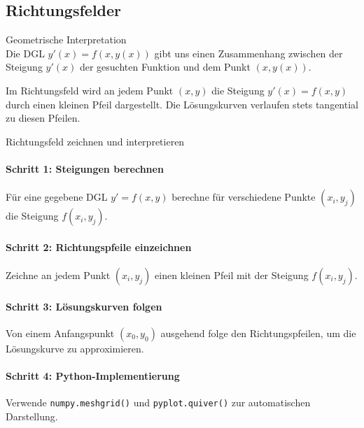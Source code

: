 \raggedcolumns
\columnbreak

\subsection{Richtungsfelder}

\begin{concept}{Geometrische Interpretation}\\
Die DGL $y'(x) = f(x, y(x))$ gibt uns einen Zusammenhang zwischen der Steigung $y'(x)$ der gesuchten Funktion und dem Punkt $(x, y(x))$.

Im Richtungsfeld wird an jedem Punkt $(x,y)$ die Steigung $y'(x) = f(x,y)$ durch einen kleinen Pfeil dargestellt. Die Lösungskurven verlaufen stets tangential zu diesen Pfeilen.
\end{concept}

\begin{KR}{Richtungsfeld zeichnen und interpretieren}
\paragraph{Schritt 1: Steigungen berechnen}
Für eine gegebene DGL $y' = f(x,y)$ berechne für verschiedene Punkte $(x_i, y_j)$ die Steigung $f(x_i, y_j)$.

\paragraph{Schritt 2: Richtungspfeile einzeichnen}
Zeichne an jedem Punkt $(x_i, y_j)$ einen kleinen Pfeil mit der Steigung $f(x_i, y_j)$.

\paragraph{Schritt 3: Lösungskurven folgen}
Von einem Anfangspunkt $(x_0, y_0)$ ausgehend folge den Richtungspfeilen, um die Lösungskurve zu approximieren.

\paragraph{Schritt 4: Python-Implementierung}
Verwende \texttt{numpy.meshgrid()} und \texttt{pyplot.quiver()} zur automatischen Darstellung.
\end{KR}

